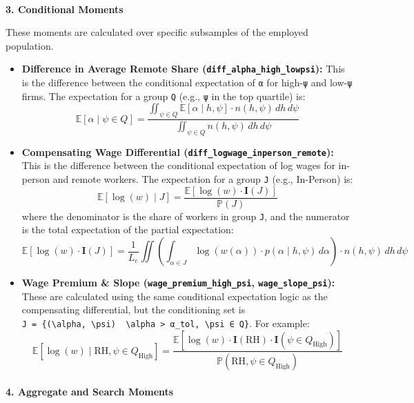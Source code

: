 \documentclass[
  11pt,
  letterpaper,
  DIV=11,
  numbers=noendperiod]{scrartcl}
\makeatletter
\let\oldparagraph\paragraph
\renewcommand{\paragraph}{
    \@ifstar
      \xxxParagraphStar
      \xxxParagraphNoStar
  }
\newcommand{\xxxParagraphStar}[1]{\oldparagraph*{#1}\mbox{}}
\newcommand{\xxxParagraphNoStar}[1]{\oldparagraph{#1}\mbox{}}
\makeatother
\begin{document}
\paragraph{\texorpdfstring{\textbf{3. Conditional
Moments}}{3. Conditional Moments}}\label{conditional-moments}

These moments are calculated over specific subsamples of the employed
population.

\begin{itemize}
\item
  \textbf{Difference in Average Remote Share
  (\texttt{diff\_alpha\_high\_lowpsi}):} This is the difference between
  the conditional expectation of \texttt{α} for high-\texttt{ψ} and
  low-\texttt{ψ} firms. The expectation for a group \texttt{Q} (e.g.,
  \texttt{ψ} in the top quartile) is:
  \[ \mathbb{E}[\alpha \mid \psi \in Q] = \frac{\iint_{\psi \in Q} \mathbb{E}[\alpha \mid h, \psi] \cdot n(h, \psi) \,dh \,d\psi}{\iint_{\psi \in Q} n(h, \psi) \,dh \,d\psi} \]
\item
  \textbf{Compensating Wage Differential
  (\texttt{diff\_logwage\_inperson\_remote}):} This is the difference
  between the conditional expectation of log wages for in-person and
  remote workers. The expectation for a group \texttt{J} (e.g.,
  In-Person) is:
  \[ \mathbb{E}[\log(w) \mid J] = \frac{\mathbb{E}[\log(w) \cdot \mathbf{I}(J)]}{\mathbb{P}(J)} \]
  where the denominator is the share of workers in group \texttt{J}, and
  the numerator is the total expectation of the partial expectation:
  \[ \mathbb{E}[\log(w) \cdot \mathbf{I}(J)] = \frac{1}{L_e} \iint \left( \int_{\alpha \in J} \log(w(\alpha)) \cdot p(\alpha \mid h, \psi) \,d\alpha \right) \cdot n(h, \psi) \,dh \,d\psi \]
\item
  \textbf{Wage Premium \& Slope (\texttt{wage\_premium\_high\_psi},
  \texttt{wage\_slope\_psi}):} These are calculated using the same
  conditional expectation logic as the compensating differential, but
  the conditioning set is
  \texttt{J\ =\ \{(\textbackslash{}alpha,\ \textbackslash{}psi)\ \textbar{}\ \textbackslash{}alpha\ \textgreater{}\ α\_tol,\ \textbackslash{}psi\ ∈\ Q\}}.
  For example:
  \[ \mathbb{E}[\log(w) \mid \text{RH}, \psi \in Q_{\text{High}}] = \frac{\mathbb{E}[\log(w) \cdot \mathbf{I}(\text{RH}) \cdot \mathbf{I}(\psi \in Q_{\text{High}})]}{\mathbb{P}(\text{RH}, \psi \in Q_{\text{High}})} \]
\end{itemize}

\paragraph{\texorpdfstring{\textbf{4. Aggregate and Search
Moments}}{4. Aggregate and Search Moments}}\label{aggregate-and-search-moments}
\end{document}
